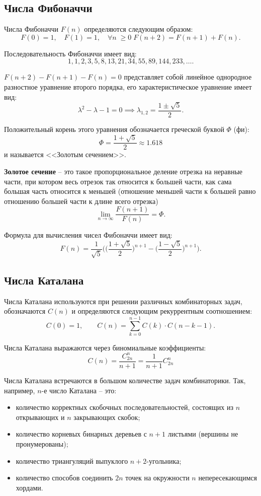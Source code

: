 \subsection{Числа Фибоначчи}

Числа Фибоначчи \(F(n)\) определяются следующим образом:
\[
    F(0) = 1,
    \quad
    F(1) = 1,
    \quad
    \forall n \; \geq 0 \; F(n + 2) = F(n + 1) + F(n).
\]

Последовательность Фибоначчи имеет вид:
\[
    1, 1, 2, 3, 5, 8, 13, 21, 34, 55, 89, 144, 233, \ldots.
\]

\(F(n + 2) - F(n + 1) - F(n) = 0\) представляет собой линейное однородное разностное уравнение второго порядка, его характеристическое уравнение имеет вид:
\[
    \lambda^2 - \lambda - 1 = 0
    \implies
    \lambda_{1, 2} = \frac{1 \pm \sqrt{5}}{2}.
\]

Положительный корень этого уравнения обозначается греческой буквой \(\Phi\) (фи):
\[
    \Phi = \frac{1 + \sqrt{5}}{2} \approx 1.618
\]
и называется <<Золотым сечением>>.

\textbf{Золотое сечение} -- это такое пропорциональное деление отрезка на неравные части, при котором весь отрезок так относится к большей части, как сама большая часть относится к меньшей (отношение меньшей части к большей равно отношению большей части к длине всего отрезка)
\[
    \lim_{n \to \infty} \frac{F(n + 1)}{F(n)} = \Phi.
\]

Формула для вычисления чисел Фибоначчи имеет вид:
\[
    F(n) = \frac{1}{\sqrt{5}} \Bigg( \bigg(\frac{1 + \sqrt{5}}{2} \bigg)^{n + 1} - \bigg( \frac{1 - \sqrt{5}}{2} \bigg)^{n + 1} \Bigg).
\]

\subsection{Числа Каталана}

Числа Каталана используются при решении различных комбинаторных задач, обозначаются \(C(n)\) и определяются следующим рекуррентным соотношением:
\[
    C(0) = 1,
    \qquad
    C(n) = \sum_{k = 0}^{n - 1} C(k) \cdot C(n - k - 1).
\]

Числа Каталана выражаются через биномиальные коэффициенты:
\[
    C(n) = \frac{C_{2n}^n}{n + 1} = \frac{1}{n + 1} C_{2n}^n
\]

Числа Каталана встречаются в большом количестве задач комбинаторики. Так, например, \(n\)-е число Каталана -- это:
\begin{itemize}
    \item количество корректных скобочных последовательностей, состоящих из \(n\) открывающих и \(n\) закрывающих скобок;
    \item количество корневых бинарных деревьев с \(n + 1\) листьями (вершины не пронумерованы);
    \item количество триангуляций выпуклого \(n + 2\)-угольника;
    \item количество способов соединить \(2n\) точек на окружности \(n\) непересекающимся хордами.
\end{itemize}
